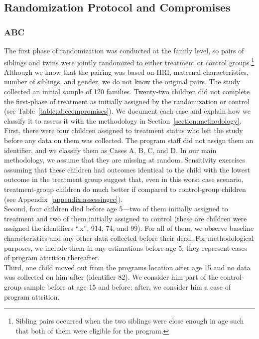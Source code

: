 \subsection{Randomization Protocol and Compromises} \label{section:randomization}

\subsubsection{ABC}

\noindent The first phase of randomization was conducted at the family level, so pairs of siblings and twins were jointly randomized to either treatment or control groups.\footnote{Sibling pairs occurred when the two siblings were close enough in age such that both of them were eligible for the program.} Although we know that the pairing was based on HRI, maternal characteristics, number of siblings, and gender, we do not know the original pairs. The study collected an initial sample of 120 families. Twenty-two children did not complete the first-phase of treatment as initially assigned by the randomization or control (see Table~\ref{table:abccompromises}). We document each case and explain how we classify it to assess it with the methodology in Section~\ref{section:methodology}.\\

\noindent First, there were four children assigned to treatment status who left the study before any data on them was collected. The program staff did not assign them an identifier, and we classify them as Cases A, B, C, and D. In our main methodology, we assume that they are missing at random. Sensitivity exercises assuming that these children had outcomes identical to the child with the lowest outcome in the treatment group suggest that, even in this worst case scenario, treatment-group children do much better if compared to control-group children (see Appendix~\ref{appendix:assessingcc}).\\

\noindent Second, four children died before age 5---two of them initially assigned to treatment and two of them initially assigned to control (these are children were assigned the identifiers ``.x'', 914, 74, and 99). For all of them, we observe baseline characteristics and any other data collected before their dead. For methodological purposes, we include them in any estimations before age 5; they represent cases of program attrition thereafter.\\

\noindent Third, one child moved out from the programs location after age 15 and no data was collected on him after (identifier 82). We consider him part of the control-group sample before at age 15 and before; after, we consider him a case of program attrition.\\


